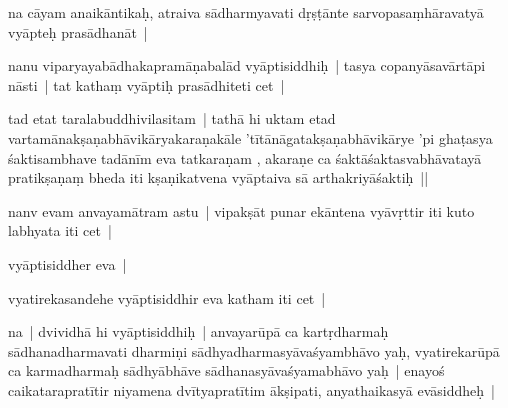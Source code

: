 \documentclass[article,12pt,a4paper]{memoir}%
\newcounter{parCount}
\begin{document}
	  
	  \pstart \leavevmode%
	\label{thakur75-70.9}na cāyam anaikāntikaḥ, atraiva sādharmyavati dṛṣṭānte sarvopasaṃhāravatyā vyāpteḥ prasādhanāt |
	{}
	\pend%
      

	  
	  \pstart \leavevmode%
	\label{thakur75-70.10}nanu viparyayabādhakapramāṇabalād vyāptisiddhiḥ | tasya copanyāsavārtāpi nāsti | tat kathaṃ vyāptiḥ prasādhiteti cet | 
	{}
	\pend%
      

	  
	  \pstart \leavevmode%
	\label{thakur75-70.11}tad etat taralabuddhivilasitam | tathā hi uktam etad vartamānakṣaṇabhāvikāryakaraṇakāle 'tītānāgatakṣaṇabhāvikārye 'pi ghaṭasya śaktisambhave tadānīm eva tatkaraṇam , akaraṇe ca śaktāśaktasvabhāvatayā pratikṣaṇaṃ bheda iti kṣaṇikatvena vyāptaiva sā arthakriyāśaktiḥ || 
	{}
	\pend%
      

	  
	  \pstart \leavevmode%
	\label{thakur75-70.15}nanv evam anvayamātram astu | vipakṣāt punar ekāntena vyāvṛttir iti kuto labhyata iti cet | 
	{}
	\pend%
      

	  
	  \pstart \leavevmode%
	\label{thakur75-70.16}vyāptisiddher eva |
	{}
	\pend%
      

	  
	  \pstart \leavevmode%
	\label{thakur75-70.16a}vyatirekasandehe vyāptisiddhir eva katham iti cet | 
	{}
	\pend%
      

	  
	  \pstart \leavevmode%
	\label{thakur75-70.17}na | dvividhā hi vyāptisiddhiḥ | anvayarūpā ca kartṛdharmaḥ sādhanadharmavati dharmiṇi sādhyadharmasyāvaśyambhāvo yaḥ, vyatirekarūpā ca karmadharmaḥ sādhyābhāve sādhanasyāvaśyamabhāvo yaḥ | enayoś caikatarapratītir niyamena dvītyapratītim ākṣipati, anyathaikasyā evāsiddheḥ |
	{}
	\pend%
      
\end{document}
